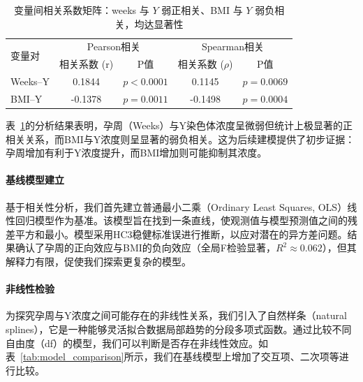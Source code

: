 \documentclass[withoutpreface]{cumcmthesis}
\begin{document}
\begin{table}[htbp]
  \centering
  \caption{变量间相关系数矩阵：weeks 与 $Y$ 弱正相关、BMI 与 $Y$ 弱负相关，均达显著性}
  \label{tab:correlation}
  \begin{tabular}{lcccc}
    \toprule
    \multirow{2}{*}{变量对} & \multicolumn{2}{c}{Pearson相关} & \multicolumn{2}{c}{Spearman相关} \\
    \cmidrule(lr){2-3} \cmidrule(lr){4-5}
    & 相关系数 (r) & P值 & 相关系数 ($\rho$) & P值 \\
    \midrule
    Weeks–Y & 0.1844 & $p < 0.0001$ & 0.1145 & $p = 0.0069$ \\
    BMI–Y  & -0.1378 & $p = 0.0011$ & -0.1498 & $p = 0.0004$ \\
    \bottomrule
  \end{tabular}
\end{table}

表~\ref{tab:correlation}的分析结果表明，孕周（Weeks）与Y染色体浓度呈微弱但统计上极显著的正相关关系，而BMI与Y浓度则呈显著的弱负相关。这为后续建模提供了初步证据：孕周增加有利于Y浓度提升，而BMI增加则可能抑制其浓度。

\paragraph{基线模型建立}
基于相关性分析，我们首先建立普通最小二乘（Ordinary Least Squares, OLS）线性回归模型作为基准。该模型旨在找到一条直线，使观测值与模型预测值之间的残差平方和最小。模型采用HC3稳健标准误进行推断，以应对潜在的异方差问题。结果确认了孕周的正向效应与BMI的负向效应（全局F检验显著，$R^2\approx0.062$），但其解释力有限，促使我们探索更复杂的模型。

\paragraph{非线性检验}
为探究孕周与Y浓度之间可能存在的非线性关系，我们引入了自然样条（natural splines），它是一种能够灵活拟合数据局部趋势的分段多项式函数。通过比较不同自由度（df）的模型，我们可以判断是否存在非线性效应。如表~\ref{tab:model_comparison}所示，我们在基线模型上增加了交互项、二次项等进行比较。
\end{document}
